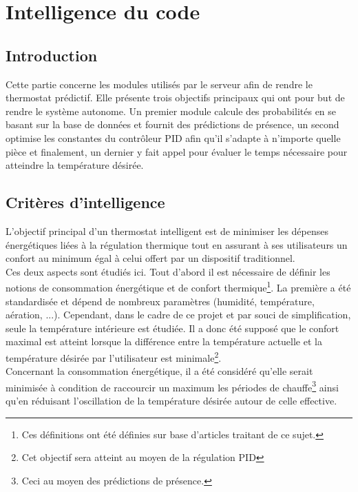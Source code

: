 \documentclass[11pt,a4paper,11pt]{report}
\begin{document}
\chapter{Intelligence du code}
\label{intelligence}

\section{Introduction}
Cette partie concerne les modules utilisés par le serveur afin de rendre le thermostat prédictif. Elle présente trois objectifs principaux qui ont pour but de rendre le système autonome. Un premier module calcule des probabilités en se basant sur la base de données et fournit des prédictions de présence, un second optimise les constantes du contrôleur PID afin qu'il s'adapte à n'importe quelle pièce et finalement, un dernier y fait appel pour évaluer le temps nécessaire pour atteindre la température désirée. \\

\section{Critères d'intelligence}
\label{critere_intelligence}

L'objectif principal d'un thermostat intelligent est de minimiser les dépenses énergétiques liées à la régulation thermique tout en assurant à ses utilisateurs un confort au minimum égal à celui offert par un dispositif traditionnel. \\

Ces deux aspects sont étudiés ici. Tout d'abord il est nécessaire de définir les notions de consommation énergétique et de confort thermique\footnote{Ces définitions ont été définies sur base d'articles traitant de ce sujet.}. La première a été standardisée \cite{confort_thermique} et dépend de nombreux paramètres (humidité, température, aération, ...). Cependant, dans le cadre de ce projet et par souci de simplification, seule la température intérieure est étudiée. Il a donc été supposé que le confort maximal est atteint lorsque la différence entre la température actuelle et la température désirée par l'utilisateur est minimale\footnote{Cet objectif sera atteint au moyen de la régulation PID}.\\

Concernant la consommation énergétique, il a été considéré qu'elle serait minimisée à condition de raccourcir un maximum les périodes de chauffe\footnote{Ceci au moyen des prédictions de présence.} ainsi qu'en réduisant l'oscillation de la température désirée autour de celle effective.\\
\end{document}

